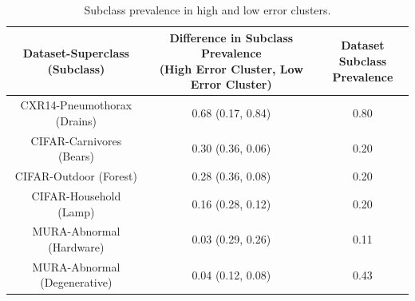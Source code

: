 \documentclass{article}
\begin{document}
 \begin{table}[]
 \centering
\begin{tabular}{|c|c|c|}
\hline
 Dataset-Superclass (Subclass) & \makecell{Difference in Subclass Prevalence \\ (High Error Cluster, Low Error Cluster)}  & \makecell{Dataset Subclass \\ Prevalence} \\
 \hline
 CXR14-Pneumothorax (Drains) & 0.68 (0.17, 0.84) & 0.80\\
 CIFAR-Carnivores (Bears) & 0.30 (0.36, 0.06) & 0.20\\
 CIFAR-Outdoor (Forest) & 0.28 (0.36, 0.08) & 0.20\\
 CIFAR-Household (Lamp) & 0.16 (0.28, 0.12) & 0.20\\
 MURA-Abnormal (Hardware) & 0.03 (0.29, 0.26) & 0.11\\
 MURA-Abnormal (Degenerative) & 0.04 (0.12, 0.08) & 0.43\\
 \hline
\end{tabular}
\caption{ Subclass prevalence in high and low error clusters.}
\label{tab:clustercifar-1}
\vspace{- 9 mm}
\end{table}


%
\end{document}
